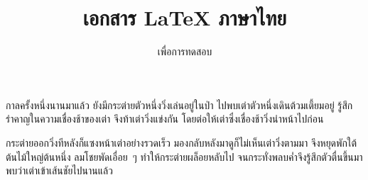 \documentclass[a4paper]{article}
\title{เอกสาร \LaTeX{} ภาษา{\wbr}ไทย}
\author{เพื่อ{\wbr}การ{\wbr}ทดสอบ}
\date{}
\begin{document}
\maketitle

กาล{\wbr}ครั้ง{\wbr}หนึ่ง{\wbr}นาน{\wbr}มา{\wbr}แล้ว ยัง{\wbr}มี{\wbr}กระต่าย{\wbr}ตัว{\wbr}หนึ่ง{\wbr}วิ่ง{\wbr}เล่น{\wbr}อยู่{\wbr}ใน{\wbr}ป่า ไป{\wbr}พบ{\wbr}เต่า{\wbr}ตัว{\wbr}หนึ่ง{\wbr}เดิน{\wbr}ต้วมเตี้ยม{\wbr}อยู่{\wbr}
รู้สึก{\wbr}รำคาญ{\wbr}ใน{\wbr}ความ{\wbr}เชื่องช้า{\wbr}ของ{\wbr}เต่า จึง{\wbr}ท้า{\wbr}เต่า{\wbr}วิ่ง{\wbr}แข่ง{\wbr}กัน โดย{\wbr}ต่อ{\wbr}ให้{\wbr}เต่า{\wbr}ซึ่ง{\wbr}เชื่องช้า{\wbr}วิ่ง{\wbr}นำ{\wbr}หน้า{\wbr}ไป{\wbr}ก่อน{\wbr}

กระต่าย{\wbr}ออก{\wbr}วิ่ง{\wbr}ทีหลัง{\wbr}ก็{\wbr}แซง{\wbr}หน้า{\wbr}เต่า{\wbr}อย่าง{\wbr}รวดเร็ว มอง{\wbr}กลับ{\wbr}หลัง{\wbr}มา{\wbr}ดู{\wbr}ก็{\wbr}ไม่{\wbr}เห็น{\wbr}เต่า{\wbr}วิ่ง{\wbr}ตาม{\wbr}มา{\wbr}
จึง{\wbr}หยุด{\wbr}พัก{\wbr}ใต้{\wbr}ต้นไม้{\wbr}ใหญ่{\wbr}ต้น{\wbr}หนึ่ง ลม{\wbr}โชย{\wbr}พัด{\wbr}เอื่อย~{\wbr}ๆ ทำให้{\wbr}กระต่าย{\wbr}ผล็อย{\wbr}หลับ{\wbr}ไป{\wbr}
จน{\wbr}กระทั่ง{\wbr}พลบค่ำ{\wbr}จึง{\wbr}รู้สึก{\wbr}ตัว{\wbr}ตื่น{\wbr}ขึ้น{\wbr}มา{\wbr}พบ{\wbr}ว่า{\wbr}เต่า{\wbr}เข้า{\wbr}เส้นชัย{\wbr}ไป{\wbr}นาน{\wbr}แล้ว{\wbr}
\end{document}
